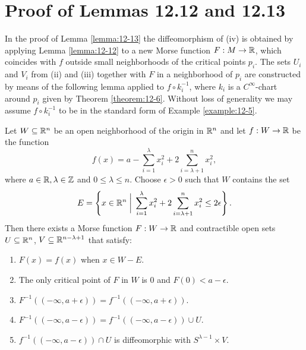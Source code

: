 \chapter{Proof of Lemmas 12.12 and 12.13}
In the proof of Lemma \ref{lemma:12-13} the diffeomorphism of (iv) is obtained by applying
Lemma \ref{lemma:12-12} to a new Morse function $F:M\to{\ensuremath{\mathbb{R}}}$, which coincides with $f$ outside
small neighborhoods of the critical points $p_i$. The sets $U_i$ and $V_i$ from (ii) and
(iii) together with $F$ in a neighborhood of $p_i$ are constructed by means of the
following lemma applied to $f\circ k_i^{-1}$, where $k_i$ is a $C^\infty$-chart around $p_i$ given by
Theorem \ref{theorem:12-6}. Without loss of generality we may assume $f\circ k_i^{-1}$ to be in the
standard form of Example \ref{example:12-5}.

\begin{lemma}\label{lemma:C.1}
  Let $W\subseteq{\ensuremath{\mathbb{R}}}^n$ be an open neighborhood of the origin in ${\mathbb{R}}^n$ and let $f:W\to{\ensuremath{\mathbb{R}}}$ be the function
  \[
    f(x) = a - \sum_{i=1}^\lambda x_i^2 + 2\sum_{i=\lambda+1}^{n }{x_i^2},
  \]
  where $a\in{\ensuremath{\mathbb{R}}},\lambda\in{\ensuremath{\mathbb{Z}}}$ and $0\le\lambda\le n$. Choose $\epsilon>0$ such that $W$ contains the set 
  \[
    E = \left\{x\in{\ensuremath{\mathbb{R}}}^n\;\bigg|\; \sum_{i=1}^\lambda x_i^2 + 2\sum_{i=\lambda+1}^{n }{x_i^2}\le 2\epsilon\right\}.
  \] 
  Then there exists a Morse function $F:W\to{\ensuremath{\mathbb{R}}}$ and contractible open sets $U\subseteq{\ensuremath{\mathbb{R}}}^n$, $V\subseteq{\ensuremath{\mathbb{R}}}^{n-\lambda+1}$
  that satisfy:
  \begin{enumerate}
    \item $F(x) = f(x)$ when $x\in W- E$.
    \item The only critical point of $F$ in $W$ is 0 and $F(0)<a-\epsilon$.
    \item $F^{-1}((-\infty, a+\epsilon)) = f^{-1}((-\infty, a+\epsilon))$.
    \item $F^{-1}((-\infty, a-\epsilon)) = f^{-1}((-\infty, a-\epsilon))\cup U$.
    \item $f^{-1}((-\infty, a-\epsilon))\cap U$ is diffeomorphic with $S^{\lambda-1}\times V$.
  \end{enumerate}
\end{lemma}

